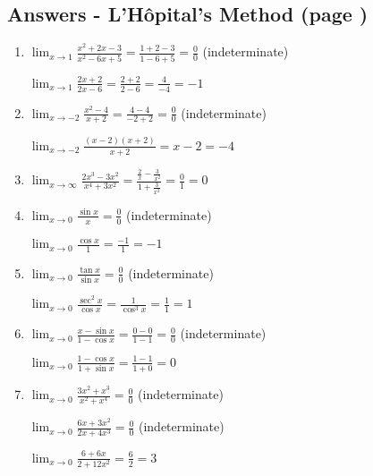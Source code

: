 \documentclass[../main.tex]{subfiles}
\begin{document}
\subsection*{Answers - L'H\^{o}pital's Method (page \pageref{L'hopital})}
\label{L'hopital answers}
\begin{spacing}{2}
\begin{enumerate}[itemsep=0.7cm]
    \item 
    $\displaystyle \lim_{x\rightarrow 1}\frac{x^2+2x-3}{x^2-6x+5}=\frac{1+2-3}{1-6+5}=\frac{0}{0}$ (indeterminate)

    $\displaystyle \lim_{x\rightarrow 1}\frac{2x+2}{2x-6}=\frac{2+2}{2-6}=\frac{4}{-4}=-1$

    \item 
    $\displaystyle \lim_{x\rightarrow -2}\frac{x^2-4}{x+2}=\frac{4-4}{-2+2}=\frac{0}{0}$ (indeterminate)

    $\displaystyle \lim_{x\rightarrow -2}\frac{(x-2)(x+2)}{x+2}=x-2=-4$

    \item 
    $\displaystyle \lim_{x\rightarrow \infty}\frac{2x^3-3x^2}{x^4+3x^2}=\frac{\frac{2}{x}-\frac{3}{x^2}}{1+\frac{3}{x^2}}=\frac{0}{1}=0$

    \item 
    $\displaystyle \lim_{x\rightarrow 0}\frac{\sin{x}}{x}=\frac{0}{0}$ (indeterminate)

    $\displaystyle \lim_{x\rightarrow 0}\frac{\cos{x}}{1}=\frac{-1}{1}=-1$

    \item 
    $\displaystyle \lim_{x\rightarrow 0}\frac{\tan{x}}{\sin{x}}=\frac{0}{0}$ (indeterminate)

    $\displaystyle \lim_{x\rightarrow 0}\frac{\sec^2{x}}{\cos{x}}=\frac{1}{\cos^3{x}}=\frac{1}{1}=1$

    \item 
    $\displaystyle \lim_{x\rightarrow 0}\frac{x-\sin{x}}{1-\cos{x}}=\frac{0-0}{1-1}=\frac{0}{0}$ (indeterminate)

    $\displaystyle \lim_{x\rightarrow 0}\frac{1-\cos{x}}{1+\sin{x}}=\frac{1-1}{1+0}=0$

    \item 
    $\displaystyle \lim_{x\rightarrow 0}\frac{3x^2+x^3}{x^2+x^4}=\frac{0}{0}$ (indeterminate)

    $\displaystyle \lim_{x\rightarrow 0}\frac{6x+3x^2}{2x+4x^3}=\frac{0}{0}$ (indeterminate)

    $\displaystyle \lim_{x\rightarrow 0}\frac{6+6x}{2+12x^2}=\frac{6}{2}=3$


\end{enumerate}
\end{spacing}
\end{document}
